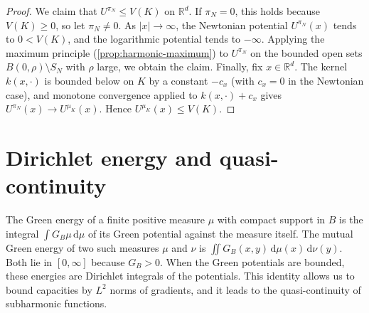 \begin{proof}
We claim that $U^{\pi_N}\leq V(K)$ on $\mathbb R^d$. If $\pi_N=0$, this holds because $V(K)\geq0$, so let $\pi_N\neq0$. As $|x|\to\infty$, the Newtonian potential $U^{\pi_N}(x)$ tends to $0<V(K)$, and the logarithmic potential tends to $-\infty$. Applying the maximum principle (\cref{prop:harmonic-maximum}) to $U^{\pi_N}$ on the bounded open sets $B(0,\rho)\setminus S_N$ with $\rho$ large, we obtain the claim. Finally, fix $x\in\mathbb R^d$. The kernel $k(x,\cdot)$ is bounded below on $K$ by a constant $-c_x$ (with $c_x=0$ in the Newtonian case), and monotone convergence applied to $k(x,\cdot)+c_x$ gives $U^{\pi_N}(x)\to U^{\mu_K}(x)$. Hence $U^{\mu_K}(x)\leq V(K)$.
\end{proof}

\section{Dirichlet energy and quasi-continuity}
\label{sec:dirichlet-quasicontinuity}
The Green energy of a finite positive measure $\mu$ with compact support in $B$ is the integral $\int G_B\mu\,\mathrm d\mu$ of its Green potential against the measure itself. The mutual Green energy of two such measures $\mu$ and $\nu$ is $\iint G_B(x,y)\,\mathrm d\mu(x)\,\mathrm d\nu(y)$. Both lie in $[0,\infty]$ because $G_B>0$. When the Green potentials are bounded, these energies are Dirichlet integrals of the potentials. This identity allows us to bound capacities by $L^2$ norms of gradients, and it leads to the quasi-continuity of subharmonic functions.

